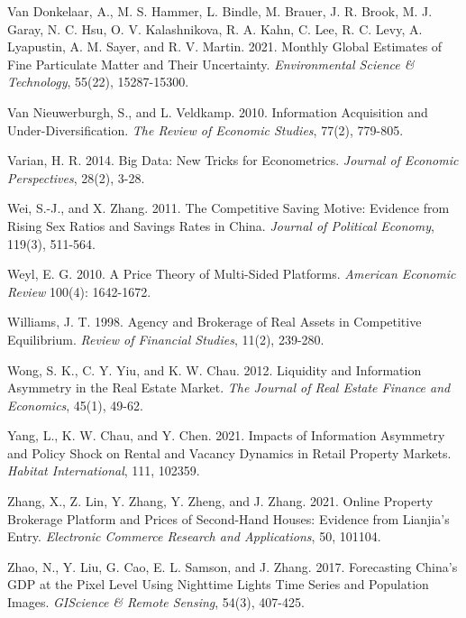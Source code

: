 \documentclass[11pt]{article}
\begin{document}
\begin{singlespace}
\begin{thebibliography}{}
Van Donkelaar, A., M. S. Hammer, L. Bindle, M. Brauer, J. R. Brook, M. J. Garay, N. C. Hsu, O. V. Kalashnikova, R. A. Kahn, C. Lee, R. C. Levy, A. Lyapustin, A. M. Sayer, and R. V. Martin. 2021. Monthly Global Estimates of Fine Particulate Matter and Their Uncertainty. \textit{Environmental Science \& Technology}, 55(22), 15287-15300. 

Van Nieuwerburgh, S., and L. Veldkamp. 2010. Information Acquisition and Under-Diversification. \textit{The Review of Economic Studies}, 77(2), 779-805. 

Varian, H. R. 2014. Big Data: New Tricks for Econometrics. \textit{Journal of Economic Perspectives}, 28(2), 3-28. 

Wei, S.-J., and X. Zhang. 2011. The Competitive Saving Motive: Evidence from Rising Sex Ratios and Savings Rates in China. \textit{Journal of Political Economy}, 119(3), 511-564. 

Weyl, E. G. 2010. A Price Theory of Multi-Sided Platforms. \textit{American Economic Review} 100(4): 1642-1672. %

Williams, J. T. 1998. Agency and Brokerage of Real Assets in Competitive Equilibrium. \textit{Review of Financial Studies}, 11(2), 239-280. 

Wong, S. K., C. Y. Yiu, and K. W. Chau. 2012. Liquidity and Information Asymmetry in the Real Estate Market. \textit{The Journal of Real Estate Finance and Economics}, 45(1), 49-62. 

Yang, L., K. W. Chau, and Y. Chen. 2021. Impacts of Information Asymmetry and Policy Shock on Rental and Vacancy Dynamics in Retail Property Markets. \textit{Habitat International}, 111, 102359. 

Zhang, X., Z. Lin, Y. Zhang, Y. Zheng, and J. Zhang. 2021. Online Property Brokerage Platform and Prices of Second-Hand Houses: Evidence from Lianjia's Entry. \textit{Electronic Commerce Research and Applications}, 50, 101104. 

Zhao, N., Y. Liu, G. Cao, E. L. Samson, and J. Zhang. 2017. Forecasting China's GDP at the Pixel Level Using Nighttime Lights Time Series and Population Images. \textit{GIScience \& Remote Sensing}, 54(3), 407-425. 


\end{thebibliography}
\end{singlespace}
\end{document}
